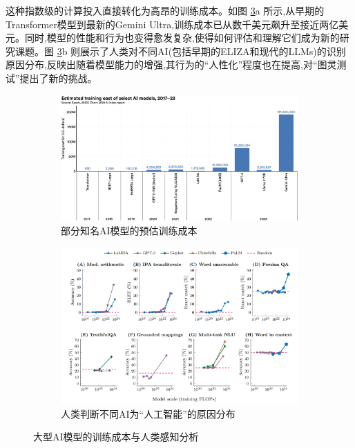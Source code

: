 这种指数级的计算投入直接转化为高昂的训练成本。如图 \ref{fig:llm_cost_perception}a 所示,从早期的Transformer模型到最新的Gemini Ultra,训练成本已从数千美元飙升至接近两亿美元。同时,模型的性能和行为也变得愈发复杂,使得如何评估和理解它们成为新的研究课题。图 \ref{fig:llm_cost_perception}b 则展示了人类对不同AI(包括早期的ELIZA和现代的LLMs)的识别原因分布,反映出随着模型能力的增强,其行为的“人性化”程度也在提高,对“图灵测试”提出了新的挑战。
\begin{figure}[htbp]
    \centering
    \begin{subfigure}[b]{0.48\textwidth}
        \centering
        \includegraphics[width=\textwidth]{figures/LLM5.png}
        \caption{部分知名AI模型的预估训练成本}
        \label{fig:llm_training_cost}
    \end{subfigure}
    \hfill
    \begin{subfigure}[b]{0.48\textwidth}
        \centering
        \includegraphics[width=\textwidth]{figures/LLM6.png}
        \caption{人类判断不同AI为“人工智能”的原因分布}
        \label{fig:llm_reason_class}
    \end{subfigure}
    \caption{大型AI模型的训练成本与人类感知分析}
    \label{fig:llm_cost_perception}
\end{figure}

